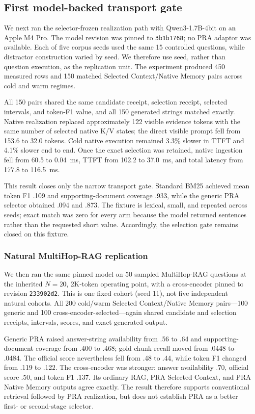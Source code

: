 \documentclass[11pt]{article}
\begin{document}
\subsection{First model-backed transport gate}

We next ran the selector-frozen realization path with Qwen3-1.7B-4bit on an
Apple M4 Pro. The model revision was pinned to \texttt{3b1b1768}; no PRA
adaptor was available. Each of five corpus seeds used the same 15 controlled
questions, while distractor construction varied by seed. We therefore use
seed, rather than question execution, as the replication unit. The experiment
produced 450 measured rows and 150 matched Selected Context/Native Memory pairs
across cold and warm regimes.

All 150 pairs shared the same candidate receipt, selection receipt, selected
intervals, and token-F1 value, and all 150 generated strings matched exactly.
Native realization replaced approximately 122 visible evidence tokens with the
same number of selected native K/V states; the direct visible prompt fell from
153.6 to 32.0 tokens. Cold native execution remained 3.3\% slower in TTFT and
4.1\% slower end to end. Once the exact selection was retained, native
ingestion fell from 60.5 to 0.04~ms, TTFT from 102.2 to 37.0~ms, and total
latency from 177.8 to 116.5~ms.

This result closes only the narrow transport gate. Standard BM25 achieved mean
token F1 .109 and supporting-document coverage .933, while the generic PRA
selector obtained .094 and .873. The fixture is lexical, small, and repeated
across seeds; exact match was zero for every arm because the model returned
sentences rather than the requested short value. Accordingly, the selection
gate remains closed on this fixture.

\subsubsection{Natural MultiHop-RAG replication}

We then ran the same pinned model on 50 sampled MultiHop-RAG questions at the
inherited $N=20$, 2K-token operating point, with a cross-encoder pinned to
revision \texttt{233902d2}. This is one fixed cohort (seed 11), not five
independent natural cohorts. All 200 cold/warm Selected Context/Native Memory
pairs---100 generic and 100 cross-encoder-selected---again shared candidate and
selection receipts, intervals, scores, and exact generated output.

Generic PRA raised answer-string availability from .56 to .64 and
supporting-document coverage from .400 to .468; gold-chunk recall moved from
.0448 to .0484. The official score nevertheless fell from .48 to .44, while
token F1 changed from .119 to .122. The cross-encoder was stronger: answer
availability .70, official score .50, and token F1 .137. Its ordinary RAG,
PRA Selected Context, and PRA Native Memory outputs agree exactly. The result
therefore supports conventional retrieval followed by PRA realization, but
does not establish PRA as a better first- or second-stage selector.
\end{document}
